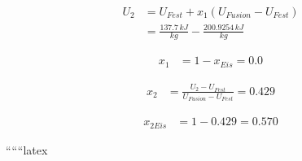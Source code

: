 \begin{align*}
    U_2 &= U_{Fest} + x_1 (U_{Fusion} - U_{Fest}) \\
    &= \frac{137.7 \, kJ}{kg} - \frac{200.9254 \, kJ}{kg}
\end{align*}

\begin{align*}
    x_1 &= 1 - x_{Eis} = 0.0
\end{align*}

\begin{align*}
    x_2 &= \frac{U_2 - U_{Fest}}{U_{Fusion} - U_{Fest}} = 0.429
\end{align*}

\begin{align*}
    x_{2Eis} &= 1 - 0.429 = 0.570
\end{align*}

``````latex


